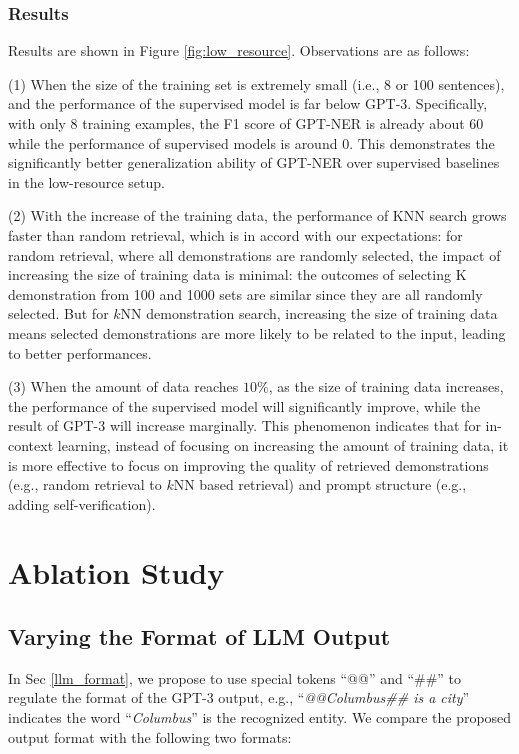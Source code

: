 \documentclass[11pt]{article}
\begin{document}
\subsubsection{Results}
Results are shown in Figure \ref{fig:low_resource}. Observations are as follows:

(1) When 
the size of the training set is extremely small  (i.e., 8 or 100 sentences), and the performance of the supervised model is far below GPT-3. 
Specifically,
with only 8 training examples, the F1 score of GPT-NER is already about 60 while the performance of supervised models is around 0.
This demonstrates the significantly better generalization ability of GPT-NER over supervised baselines in the 
 low-resource setup. 

(2) With the increase of the training data, 
the performance of KNN search grows faster than random retrieval, which is in accord with our expectations: 
for random retrieval, 
where all demonstrations are randomly selected, the impact of increasing the size of training data is minimal:
the outcomes of 
 selecting K demonstration from 100 and 1000 sets are similar since they are all randomly selected.
But for $k$NN demonstration search, increasing the size of training data 
means 
 selected demonstrations are more likely to be related to the input, leading to better performances. 

(3) When the amount of data reaches $10\%$, as the size of training data increases, the performance of the supervised model will significantly improve, while the result of GPT-3 will increase marginally. This phenomenon indicates that for in-context learning, instead of focusing on increasing the amount of training data, it is more effective to focus on improving the quality of retrieved demonstrations (e.g., random retrieval to $k$NN based retrieval) and prompt structure (e.g., adding self-verification). 

\section{Ablation Study}

\subsection{Varying the Format of LLM Output}
\label{analysis_output_format}

In Sec \ref{llm_format}, we propose to use special tokens “@@” and “\#\#” to regulate the format of the GPT-3 output, 
e.g., 
 “\textit{@@Columbus\#\# is a city}” indicates the word “\textit{Columbus}” is the recognized entity.
 We compare the proposed output format with the following two formats:
\end{document}
